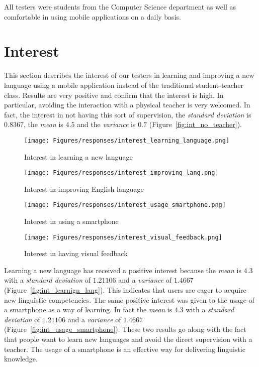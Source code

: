 \noindent All testers were students from the Computer Science department as well as comfortable in using mobile applications on a daily basis.

\section{Interest}
\label{sub:Interest}

This section describes the interest of our testers in learning and improving a new language using a mobile application instead of the traditional student-teacher class. Results are very positive and confirm that the interest is high. In particular, avoiding the interaction with a physical teacher is very welcomed. In fact, the interest in not having this sort of supervision, the \textit{standard deviation} is $0.8367$, the \textit{mean} is $4.5$ and the \textit{variance} is $0.7$ (Figure~\ref{fig:int_no_teacher}).

\begin{figure}[!ht]
	\centering
	\begin{minipage}{.5\textwidth}
		\centering
		\texttt{[image: Figures/responses/interest\_learning\_language.png]}
		\caption{Interest in learning a new language}
		\label{fig:int_learnign_lang}
	\end{minipage}%
	\begin{minipage}{.5\textwidth}
		\centering
		\texttt{[image: Figures/responses/interest\_improving\_lang.png]}
		\caption{Interest in improving English language}
		\label{fig:int_improving_lang}
	\end{minipage}
    \begin{minipage}{.5\textwidth}
        \centering
        \texttt{[image: Figures/responses/interest\_usage\_smartphone.png]}
        \caption{Interest in using a smartphone}
        \label{fig:int_usage_smartphone}
    \end{minipage}%
	\begin{minipage}{.5\textwidth}
		\centering
		\texttt{[image: Figures/responses/interest\_visual\_feedback.png]}
		\caption{Interest in having visual feedback}
		\label{fig:int_visual_feedbak}
	\end{minipage}%
\end{figure}

\noindent Learning a new language has received a positive interest because the \textit{mean} is $4.3$ with a \textit{standard deviation} of $1.21106$ and a \textit{variance} of $1.4667$ (Figure~\ref{fig:int_learnign_lang}). This indicates that users are eager to acquire new linguistic competencies. The same positive interest was given to the usage of a smartphone as a way of learning. In fact the \textit{mean} is $4.3$ with a \textit{standard deviation} of $1.21106$ and a \textit{variance} of $1.4667$ (Figure~\ref{fig:int_usage_smartphone}). These two results go along with the fact that people want to learn new languages and avoid the direct supervision with a teacher. The usage of a smartphone is an effective way for delivering linguistic knowledge. \\


